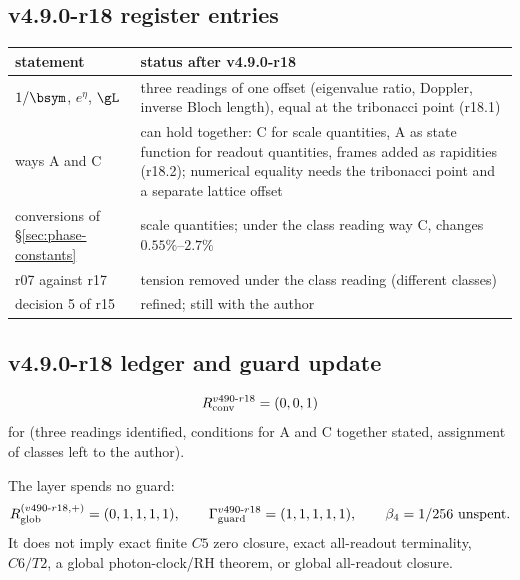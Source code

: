 \subsection*{v4.9.0-r18 register entries}
\label{subsec:v490-r18-register}

\begin{center}
\small
\begin{tabular}{@{}>{\raggedright\arraybackslash}p{}>{\raggedright\arraybackslash}p{}@{}}
\toprule
statement & status after v4.9.0-r18\\
\midrule
\(1/\bsym\), \(e^\eta\), \(\gL\) & three readings of one offset (eigenvalue ratio, Doppler, inverse Bloch length), equal at the tribonacci point (r18.1)\\
ways A and C & can hold together: C for scale quantities, A as state function for readout quantities, frames added as rapidities (r18.2); numerical equality needs the tribonacci point and a separate lattice offset\\
conversions of \S\ref{sec:phase-constants} & scale quantities; under the class reading way C, changes \(0.55\%\)--\(2.7\%\)\\
r07 against r17 & tension removed under the class reading (different classes)\\
decision 5 of r15 & refined; still with the author\\
\bottomrule
\end{tabular}
\end{center}

\subsection*{v4.9.0-r18 ledger and guard update}
\label{subsec:v490-r18-ledger-guard}

\[
R_{\rm conv}^{v490\text{-}r18}=(0,0,1)
\]
for (three readings identified, conditions for A and C together stated, assignment of classes left to the author).

The layer spends no guard:
\[
R_{\rm glob}^{(v490\text{-}r18,+)}=(0,1,1,1,1),
\qquad
\Gamma_{\rm guard}^{v490\text{-}r18}=(1,1,1,1,1),
\qquad
\beta_4=1/256\ \text{unspent}.
\]
It does not imply exact finite \(C5\) zero closure, exact all-readout terminality,
\(C6/T2\), a global photon-clock/RH theorem, or global all-readout closure.


